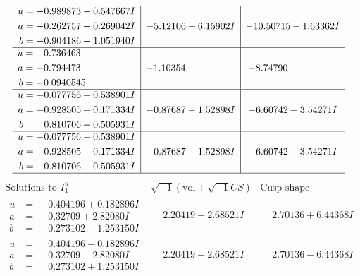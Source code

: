 \documentclass[1p]{elsarticle_modified}
\theoremstyle{definition}
\newcommand{\I}{\sqrt{-1}}
\begin{document}
$$\begin{array}{c|c|c}
\begin{aligned}
u &= -0.989873 - 0.547667 I \\
a &= -0.262757 + 0.269042 I \\
b &= -0.904186 + 1.051940 I\end{aligned}
 & -5.12106 + 6.15902 I & -10.50715 - 1.63362 I \\ \hline\begin{aligned}
u &= \phantom{-}0.736463\phantom{ +0.000000I} \\
a &= -0.794473\phantom{ +0.000000I} \\
b &= -0.0940545\phantom{ +0.000000I}\end{aligned}
 & -1.10354\phantom{ +0.000000I} & -8.74790\phantom{ +0.000000I} \\ \hline\begin{aligned}
u &= -0.077756 + 0.538901 I \\
a &= -0.928505 + 0.171334 I \\
b &= \phantom{-}0.810706 + 0.505931 I\end{aligned}
 & -0.87687 - 1.52898 I & -6.60742 + 3.54271 I \\ \hline\begin{aligned}
u &= -0.077756 - 0.538901 I \\
a &= -0.928505 - 0.171334 I \\
b &= \phantom{-}0.810706 - 0.505931 I\end{aligned}
 & -0.87687 + 1.52898 I & -6.60742 - 3.54271 I\\
 \hline 
 \end{array}$$\newpage$$\begin{array}{c|c|c}  
\text{Solutions to }I^u_{1}& \I (\text{vol} + \sqrt{-1}CS) & \text{Cusp shape}\\
 \hline 
\begin{aligned}
u &= \phantom{-}0.404196 + 0.182896 I \\
a &= \phantom{-}0.32709 + 2.82080 I \\
b &= \phantom{-}0.273102 - 1.253150 I\end{aligned}
 & \phantom{-}2.20419 + 2.68521 I & \phantom{-}2.70136 + 6.44368 I \\ \hline\begin{aligned}
u &= \phantom{-}0.404196 - 0.182896 I \\
a &= \phantom{-}0.32709 - 2.82080 I \\
b &= \phantom{-}0.273102 + 1.253150 I\end{aligned}
 & \phantom{-}2.20419 - 2.68521 I & \phantom{-}2.70136 - 6.44368 I \\ \hline\begin{aligned}

\end{aligned}
\end{array}$$
\end{document}
